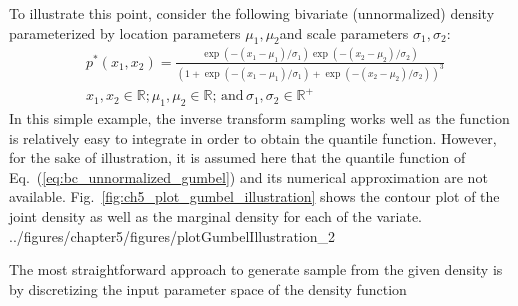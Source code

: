 To illustrate this point,
consider the following bivariate (unnormalized) density parameterized by location parameters $\mu_1, \mu_2$and scale parameters $\sigma_1, \sigma_2$:
\begin{equation}
	\begin{split}
	& p^*(x_1, x_2) = \frac{\exp{(-(x_1 - \mu_1)/\sigma_1)} \exp{(-(x_2 - \mu_2)/\sigma_2)}}{(1 + \exp{(-(x_1 - \mu_1)/\sigma_1)} + \exp{(-(x_2 - \mu_2)/\sigma_2)})^3} \, \\ 
	& x_1, x_2 \in \mathbb{R}; \mu_1, \mu_2 \in \mathbb{R};\, \text{and} \, \sigma_1, \sigma_2 \in \mathbb{R}^+
	\end{split}
\label{eq:bc_unnormalized_gumbel}
\end{equation}
In this simple example,
the inverse transform sampling works well as the function is relatively easy to integrate in order to obtain the quantile function.
However, for the sake of illustration, it is assumed here that the quantile function of Eq.~(\ref{eq:bc_unnormalized_gumbel}) and its numerical approximation are not available.
Fig.~\ref{fig:ch5_plot_gumbel_illustration} shows the contour plot of the joint density as well as the marginal density for each of the variate.
{../figures/chapter5/figures/plotGumbelIllustration_2}


The most straightforward approach to generate sample from the given density is by discretizing the input parameter space of the density function

